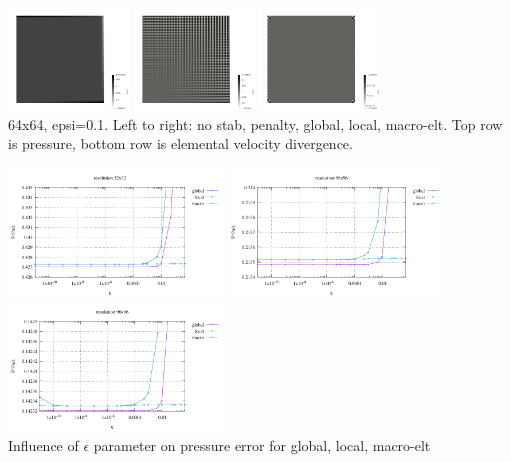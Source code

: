 \begin{center}
\includegraphics[width=3.2cm]{python_codes/fieldstone_115/results/buha06/divv2}
\includegraphics[width=3.2cm]{python_codes/fieldstone_115/results/buha06/divv3}
\includegraphics[width=3.2cm]{python_codes/fieldstone_115/results/buha06/divv4}\\
{\captionfont 64x64, epsi=0.1. Left to right: no stab, penalty, global, local, macro-elt.
Top row is pressure, bottom row is elemental velocity divergence.}
\end{center}



\begin{center}
\includegraphics[width=5.7cm]{python_codes/fieldstone_115/results/buha06/errorsP_32_eps}
\includegraphics[width=5.7cm]{python_codes/fieldstone_115/results/buha06/errorsP_64_eps}
\includegraphics[width=5.7cm]{python_codes/fieldstone_115/results/buha06/errorsP_96_eps}\\
{\captionfont Influence of $\epsilon$ parameter on pressure error for global, local, macro-elt}
\end{center}
